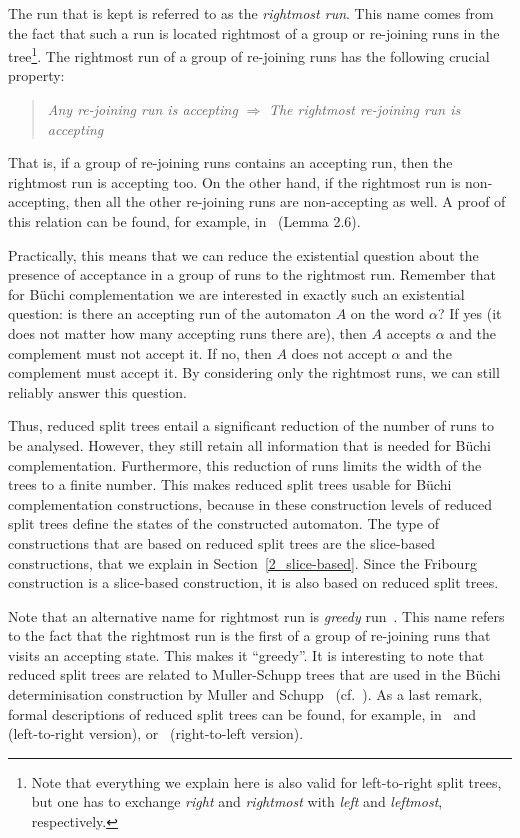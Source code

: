 The run that is kept is referred to as the \textit{rightmost run}. This name comes from the fact that such a run is located rightmost of a group or re-joining runs in the tree\footnote{Note that everything we explain here is also valid for left-to-right split trees, but one has to exchange \textit{right} and \textit{rightmost} with \textit{left} and \textit{leftmost}, respectively.}. The rightmost run of a group of re-joining runs has the following crucial property:

\begin{quote}
\centering
\textit{Any re-joining run is accepting} $\Longrightarrow$ \textit{The rightmost re-joining run is accepting}
\end{quote}

That is, if a group of re-joining runs contains an accepting run, then the rightmost run is accepting too. On the other hand, if the rightmost run is non-accepting, then all the other re-joining runs are non-accepting as well. A proof of this relation can be found, for example, in~\cite{vardi2007automata} (Lemma 2.6).

Practically, this means that we can reduce the existential question about the presence of acceptance in a group of runs to the rightmost run. Remember that for Büchi complementation we are interested in exactly such an existential question: is there an accepting run of the automaton $A$ on the word $\alpha$? If yes (it does not matter how many accepting runs there are), then $A$ accepts $\alpha$ and the complement must not accept it. If no, then $A$ does not accept $\alpha$ and the complement must accept it. By considering only the rightmost runs, we can still reliably answer this question.

Thus, reduced split trees entail a significant reduction of the number of runs to be analysed. However, they still retain all information that is needed for Büchi complementation. Furthermore, this reduction of runs limits the width of the trees to a finite number. This makes reduced split trees usable for Büchi complementation constructions, because in these construction levels of reduced split trees define the states of the constructed automaton. The type of constructions that are based on reduced split trees are the slice-based constructions, that we explain in Section~\ref{2_slice-based}. Since the Fribourg construction is a slice-based construction, it is also based on reduced split trees.

Note that an alternative name for rightmost run is \textit{greedy} run~\cite{2014_joel_ulrich}. This name refers to the fact that the rightmost run is the first of a group of re-joining runs that visits an accepting state. This makes it ``greedy''. It is interesting to note that reduced split trees are related to Muller-Schupp trees that are used in the Büchi determinisation construction by Muller and Schupp~\cite{Muller199569} (cf.~\cite{vardi2007automata,fogarty2013unifying}). As a last remark, formal descriptions of reduced split trees can be found, for example, in~\cite{vardi2007automata} and~\cite{2014_wilke} (left-to-right version), or~\cite{fogarty2013unifying} (right-to-left version).

